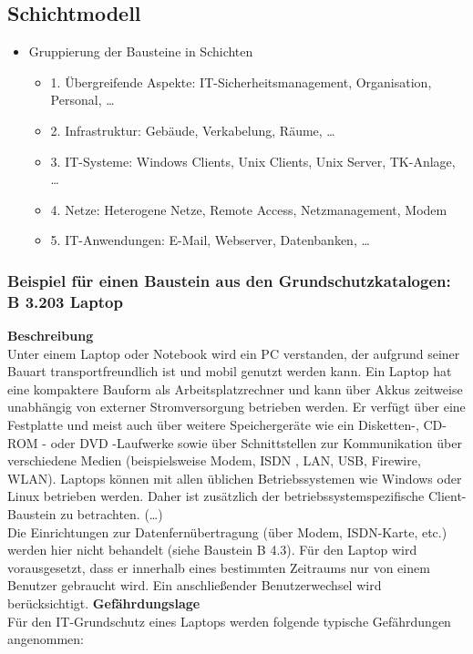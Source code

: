 \documentclass[openany]{book}
\begin{document}
\subsection{Schichtmodell}

\begin{itemize}
    \item Gruppierung der Bausteine in Schichten
    \begin{itemize}
        \item 1. Übergreifende Aspekte: IT-Sicherheitsmanagement, Organisation, Personal, \dots
        \item 2. Infrastruktur: Gebäude, Verkabelung, Räume, \dots
        \item 3. IT-Systeme: Windows Clients, Unix Clients, Unix Server, TK-Anlage, \dots
        \item 4. Netze: Heterogene Netze, Remote Access, Netzmanagement, Modem
        \item 5. IT-Anwendungen: E-Mail, Webserver, Datenbanken, \dots
    \end{itemize}
\end{itemize}

\subsubsection{Beispiel für einen Baustein aus den Grundschutzkatalogen: B 3.203 Laptop}

\textbf{Beschreibung} \\ Unter einem Laptop oder Notebook wird ein PC verstanden, der aufgrund seiner Bauart transportfreundlich ist und mobil genutzt werden kann.
Ein Laptop hat eine kompaktere Bauform als Arbeitsplatzrechner und kann über Akkus zeitweise unabhängig von externer Stromversorgung betrieben werden. Er verfügt über eine Festplatte und meist auch über 
weitere Speichergeräte wie ein Disketten-, CD-ROM - oder DVD -Laufwerke sowie über Schnittstellen zur Kommunikation über verschiedene Medien (beispielsweise Modem, 
ISDN , LAN, USB, Firewire, WLAN). Laptops können mit allen üblichen Betriebssystemen wie Windows oder Linux betrieben werden. Daher ist zusätzlich der 
betriebssystemspezifische Client-Baustein zu betrachten. (\dots) \\ 
Die Einrichtungen zur Datenfernübertragung (über Modem, ISDN-Karte, etc.) werden hier nicht behandelt (siehe Baustein B 4.3). Für den Laptop wird vorausgesetzt, dass er 
innerhalb eines bestimmten Zeitraums nur von einem Benutzer gebraucht wird. Ein anschließender Benutzerwechsel wird berücksichtigt.
\textbf{Gefährdungslage} \\ Für den IT-Grundschutz eines Laptops werden folgende typische Gefährdungen angenommen:
\end{document}
